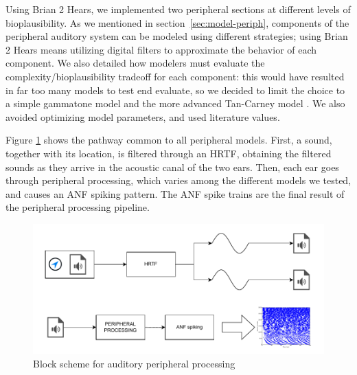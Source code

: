 \documentclass[11pt,a4paper]{article}
\begin{document}
Using Brian 2 Hears, we implemented two peripheral sections at different levels of bioplausibility. As we mentioned in section~\ref{sec:model-periph}, components of the peripheral auditory system can be modeled using different strategies; using Brian 2 Hears means utilizing digital filters to approximate the behavior of each component. We also detailed how modelers must evaluate the complexity/bioplausibility tradeoff for each component: this would have resulted in far too many models to test end evaluate, so we decided to limit the choice to a simple gammatone model and the more advanced Tan-Carney model \cite{tanPhenomenologicalModelResponses2003}. We also avoided optimizing model parameters, and used literature values.

Figure \ref{fig:block-periph-general} shows the pathway common to all peripheral models. First, a sound, together with its location, is filtered through an HRTF, obtaining the filtered sounds as they arrive in the acoustic canal of the two ears. Then, each ear goes through peripheral processing, which varies among the different models we tested, and causes an ANF spiking pattern. The ANF spike trains are the final result of the peripheral processing pipeline.

\begin{figure}
        \centering
        \includegraphics[width=1\linewidth]{Images/block-HRTF-cochlea-general.pdf}
        \caption{Block scheme for auditory peripheral processing}
        \label{fig:block-periph-general}
\end{figure}
\end{document}
